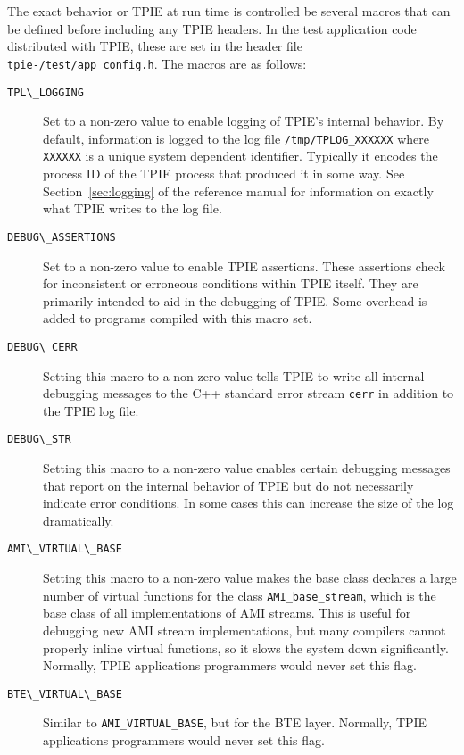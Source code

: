 The exact behavior or TPIE at run time is controlled be several macros
that can be defined before including any TPIE headers.  In the test
application code distributed with TPIE, these
are set in the header file {\tt
  tpie-\version/test/app\_config.h}.
The macros are as follows:
\begin{description}
\item[{\verb|TPL\_LOGGING|}]  Set
  to a non-zero value to enable logging of TPIE's internal behavior.
  By default, information is logged to the log file
  \verb|/tmp/TPLOG_XXXXXX| where \verb|XXXXXX| is a unique system
  dependent identifier.  Typically it encodes the process ID of the
  TPIE process that produced it in some way.  See
  Section~\ref{sec:logging} of the reference manual for information on
  exactly what TPIE writes to the log file.
\item[{\verb|DEBUG\_ASSERTIONS|}] 
  Set to a non-zero value to enable
  TPIE assertions.  These assertions check for inconsistent or
  erroneous conditions within TPIE itself.  They are primarily
  intended to aid in the debugging of TPIE.  Some overhead is added to
  programs compiled with this macro set.
\item[{\verb|DEBUG\_CERR|}] 
   Setting this macro to a non-zero value tells
  TPIE to write all internal debugging messages to the C++ standard
  error stream \verb|cerr| in addition to the TPIE log file.
\item[{\verb|DEBUG\_STR|}] 
   
  Setting this macro to a non-zero value enables certain debugging
  messages that report on the internal behavior of TPIE but do not
  necessarily indicate error conditions.  In some cases this can
  increase the size of the log dramatically.
\item[{\verb|AMI\_VIRTUAL\_BASE|}] 
   Setting this macro to a non-zero
  value makes the base class declares a large number of virtual
  functions for the class \verb|AMI_base_stream|, which is the base
  class of all implementations of AMI streams.  This is useful for
  debugging new AMI stream implementations, but many compilers cannot
  properly inline virtual functions, so it slows the system down
  significantly.  Normally, TPIE applications programmers would never
  set this flag.
\item[{\verb|BTE\_VIRTUAL\_BASE|}] 
    Similar to
  \verb|AMI_VIRTUAL_BASE|, but for the BTE layer.
  Normally, TPIE applications programmers would never
  set this flag.


\end{description}

